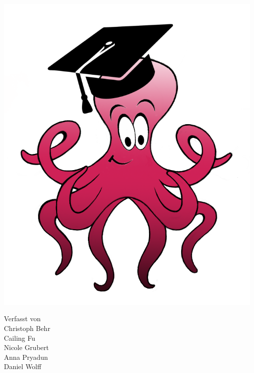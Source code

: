 \begin{titlepage}
	\centering
	\includegraphics[scale=0.35]{../Logos/GestikulaserLogoBuntOhneSchrift.png}
	\vfill
	
	\begin{center}
		Verfasst von \\[3ex]
		Christoph Behr \\
		Cailing Fu \\
		Nicole Grubert \\
		Anna Pryadun \\
		Daniel Wolff \\
	\end{center}
	
	\restoregeometry
	
\end{titlepage}